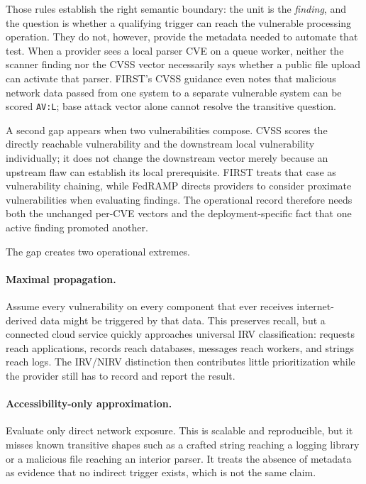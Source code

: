 \documentclass[11pt]{article}
\newcommand{\code}[1]{\texttt{#1}}
\begin{document}
Those rules establish the right semantic boundary: the unit is the
\emph{finding}, and the question is whether a qualifying trigger can reach the
vulnerable processing operation. They do not, however, provide the metadata
needed to automate that test. When a provider sees a local parser CVE on a
queue worker, neither the scanner finding nor the CVSS vector necessarily says
whether a public file upload can activate that parser. FIRST's CVSS guidance
even notes that malicious network data passed from one system to a separate
vulnerable system can be scored \code{AV:L}; base attack vector alone cannot
resolve the transitive question.\cite{cvss-user-guide}

A second gap appears when two vulnerabilities compose. CVSS scores the
directly reachable vulnerability and the downstream local vulnerability
individually; it does not change the downstream vector merely because an
upstream flaw can establish its local prerequisite. FIRST treats that case as
vulnerability chaining, while FedRAMP directs providers to consider proximate
vulnerabilities when evaluating findings.\cite{cvss-user-guide,fedramp-ver}
The operational record therefore needs both the unchanged per-CVE vectors and
the deployment-specific fact that one active finding promoted another.

The gap creates two operational extremes.

\paragraph{Maximal propagation.}
Assume every vulnerability on every component that ever receives
internet-derived data might be triggered by that data. This preserves recall,
but a connected cloud service quickly approaches universal IRV classification:
requests reach applications, records reach databases, messages reach workers,
and strings reach logs. The IRV/NIRV distinction then contributes little
prioritization while the provider still has to record and report the result.

\paragraph{Accessibility-only approximation.}
Evaluate only direct network exposure. This is scalable and reproducible, but
it misses known transitive shapes such as a crafted string reaching a logging
library or a malicious file reaching an interior parser. It treats the absence
of metadata as evidence that no indirect trigger exists, which is not the same
claim.
\end{document}
